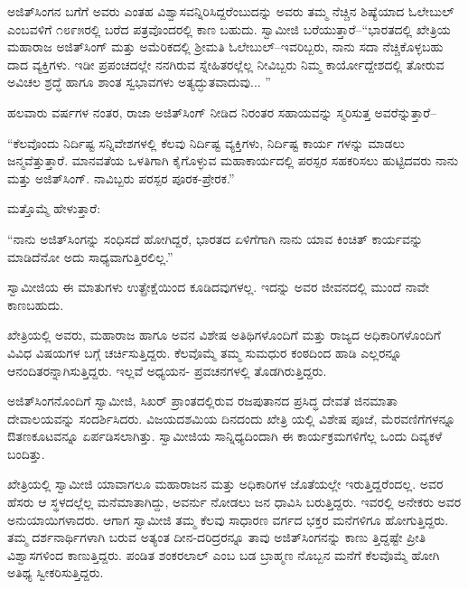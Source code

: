 ಅಜಿತ್​ಸಿಂಗನ ಬಗೆಗೆ ಅವರು ಎಂತಹ ವಿಶ್ವಾಸವನ್ನಿರಿಸಿದ್ದರೆಂಬುದನ್ನು ಅವರು ತಮ್ಮ ನೆಚ್ಚಿನ ಶಿಷ್ಯೆಯಾದ ಓಲೇಬುಲ್ ಎಂಬವಳಿಗೆ ೧೮೯೫ರಲ್ಲಿ ಬರೆದ ಪತ್ರವೊಂದರಲ್ಲಿ ಕಾಣ ಬಹುದು. ಸ್ವಾಮೀಜಿ ಬರೆಯುತ್ತಾರೆ–“ಭಾರತದಲ್ಲಿ ಖೇತ್ರಿಯ ಮಹಾರಾಜ ಅಜಿತ್​ಸಿಂಗ್ ಮತ್ತು ಅಮೆರಿಕದಲ್ಲಿ ಶ್ರೀಮತಿ ಓಲೇಬುಲ್​–ಇವರಿಬ್ಬರು, ನಾನು ಸದಾ ನೆಚ್ಚಿಕೊಳ್ಳಬಹು ದಾದ ವ್ಯಕ್ತಿಗಳು. ಇಡೀ ಪ್ರಪಂಚದಲ್ಲೇ ನನಗಿರುವ ಸ್ನೇಹಿತರಲ್ಲೆಲ್ಲ ನೀವಿಬ್ಬರು ನಿಮ್ಮ ಕಾರ್ಯೋದ್ದೇಶದಲ್ಲಿ ತೋರುವ ಅವಿಚಲ ಶ್ರದ್ಧೆ ಹಾಗೂ ಶಾಂತ ಸ್ವಭಾವಗಳು ಅತ್ಯದ್ಭುತವಾದುವು... ”

ಹಲವಾರು ವರ್ಷಗಳ ನಂತರ, ರಾಜಾ ಅಜಿತ್​ಸಿಂಗ್ ನೀಡಿದ ನಿರಂತರ ಸಹಾಯವನ್ನು ಸ್ಮರಿಸುತ್ತ ಅವರೆನ್ನುತ್ತಾರೆ–

“ಕೆಲವೊಂದು ನಿರ್ದಿಷ್ಟ ಸನ್ನಿವೇಶಗಳಲ್ಲಿ ಕೆಲವು ನಿರ್ದಿಷ್ಟ ವ್ಯಕ್ತಿಗಳು, ನಿರ್ದಿಷ್ಟ ಕಾರ್ಯ ಗಳನ್ನು ಮಾಡಲು ಜನ್ಮವೆತ್ತುತ್ತಾರೆ. ಮಾನವತೆಯ ಒಳತಿಗಾಗಿ ಕೈಗೊಳ್ಳುವ ಮಹಾಕಾರ್ಯದಲ್ಲಿ ಪರಸ್ಪರ ಸಹಕರಿಸಲು ಹುಟ್ಟಿದವರು ನಾನು ಮತ್ತು ಅಜಿತ್​ಸಿಂಗ್. ನಾವಿಬ್ಬರು ಪರಸ್ಪರ ಪೂರಕ-ಪ್ರೇರಕ.”

ಮತ್ತೊಮ್ಮೆ ಹೇಳುತ್ತಾರೆ:

“ನಾನು ಅಜಿತ್​ಸಿಂಗನ್ನು ಸಂಧಿಸದೆ ಹೋಗಿದ್ದರೆ, ಭಾರತದ ಏಳಿಗೆಗಾಗಿ ನಾನು ಯಾವ ಕಿಂಚಿತ್ ಕಾರ್ಯವನ್ನು ಮಾಡಿದೆನೋ ಅದು ಸಾಧ್ಯವಾಗುತ್ತಿರಲಿಲ್ಲ.”

ಸ್ವಾಮೀಜಿಯ ಈ ಮಾತುಗಳು ಉತ್ಪ್ರೇಕ್ಷೆಯಿಂದ ಕೂಡಿದವುಗಳಲ್ಲ. ಇದನ್ನು ಅವರ ಜೀವನದಲ್ಲಿ ಮುಂದೆ ನಾವೇ ಕಾಣಬಹುದು.

ಖೇತ್ರಿಯಲ್ಲಿ ಅವರು, ಮಹಾರಾಜ ಹಾಗೂ ಅವನ ವಿಶೇಷ ಅತಿಥಿಗಳೊಂದಿಗೆ ಮತ್ತು ರಾಜ್ಯದ ಅಧಿಕಾರಿಗಳೊಂದಿಗೆ ವಿವಿಧ ವಿಷಯಗಳ ಬಗ್ಗೆ ಚರ್ಚಿಸುತ್ತಿದ್ದರು. ಕೆಲವೊಮ್ಮೆ ತಮ್ಮ ಸುಮಧುರ ಕಂಠದಿಂದ ಹಾಡಿ ಎಲ್ಲರನ್ನೂ ಆನಂದಿತರನ್ನಾಗಿಸುತ್ತಿದ್ದರು. ಇಲ್ಲವೆ ಅಧ್ಯಯನ- ಪ್ರವಚನಗಳಲ್ಲಿ ತೊಡಗಿರುತ್ತಿದ್ದರು.

ಅಜಿತ್​ಸಿಂಗನೊಂದಿಗೆ ಸ್ವಾಮೀಜಿ, ಸಿಖರ್ ಪ್ರಾಂತದಲ್ಲಿರುವ ರಜಪುತಾನದ ಪ್ರಸಿದ್ಧ ದೇವತೆ ಜಿನಮಾತಾ ದೇವಾಲಯವನ್ನು ಸಂದರ್ಶಿಸಿದರು. ವಿಜಯದಶಮಿಯ ದಿನದಂದು ಖೇತ್ರಿ ಯಲ್ಲಿ ವಿಶೇಷ ಪೂಜೆ, ಮೆರವಣಿಗೆಗಳನ್ನೂ ಔತಣಕೂಟವನ್ನೂ ಏರ್ಪಡಿಸಲಾಗಿತ್ತು. ಸ್ವಾಮೀಜಿಯ ಸಾನ್ನಿಧ್ಯದಿಂದಾಗಿ ಈ ಕಾರ್ಯಕ್ರಮಗಳಿಗೆಲ್ಲ ಒಂದು ದಿವ್ಯಕಳೆ ಬಂದಿತ್ತು.

ಖೇತ್ರಿಯಲ್ಲಿ ಸ್ವಾಮೀಜಿ ಯಾವಾಗಲೂ ಮಹಾರಾಜನ ಮತ್ತು ಅಧಿಕಾರಿಗಳ ಜೊತೆಯಲ್ಲೇ ಇರುತ್ತಿದ್ದರೆಂದಲ್ಲ. ಅವರ ಹೆಸರು ಆ ಸ್ಥಳದಲ್ಲೆಲ್ಲ ಮನೆಮಾತಾಗಿದ್ದು, ಅವರ್ನು ನೋಡಲು ಜನ ಧಾವಿಸಿ ಬರುತ್ತಿದ್ದರು. ಇವರಲ್ಲಿ ಅನೇಕರು ಅವರ ಅನುಯಾಯಿಗಳಾದರು. ಆಗಾಗ ಸ್ವಾಮೀಜಿ ತಮ್ಮ ಕೆಲವು ಸಾಧಾರಣ ವರ್ಗದ ಭಕ್ತರ ಮನೆಗಳಿಗೂ ಹೋಗುತ್ತಿದ್ದರು. ತಮ್ಮ ದರ್ಶನಾರ್ಥಿಗಳಾಗಿ ಬರುವ ಅತ್ಯಂತ ದೀನ-ದರಿದ್ರರನ್ನೂ ತಾವು ಅಜಿತ್​ಸಿಂಗನನ್ನು ಕಾಣು ತ್ತಿದ್ದಷ್ಟೇ ಪ್ರೀತಿ ವಿಶ್ವಾಸಗಳಿಂದ ಕಾಣುತ್ತಿದ್ದರು. ಪಂಡಿತ ಶಂಕರಲಾಲ್ ಎಂಬ ಬಡ ಬ್ರಾಹ್ಮಣ ನೊಬ್ಬನ ಮನೆಗೆ ಕೆಲವೊಮ್ಮೆ ಹೋಗಿ ಅತಿಥ್ಯ ಸ್ವೀಕರಿಸುತ್ತಿದ್ದರು.

